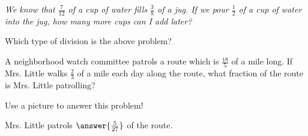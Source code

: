 \documentclass[nooutcomes]{ximera}
\begin{document}
\begin{problem}
{\em We know that $\frac{7}{12}$ of a cup of water fills $\frac{3}{8}$ of a jug.  If we pour $\frac{1}{2}$ of a cup of water into the jug, how many more cups can I add later?}

Which type of division is the above problem?
\begin{multipleChoice}
\end{multipleChoice}
\end{problem}



\begin{problem}
A neighborhood watch committee patrols a route which is $\frac{18}{5}$ of a mile long.  If Mrs. Little walks $\frac{2}{3}$ of a mile each day along the route, what fraction of the route is Mrs. Little patrolling?

Use a picture to answer this problem!

\begin{prompt}
	Mrs. Little patrols $\answer{\frac{5}{27}}$ of the route.
\end{prompt}
\end{problem}
\end{document}

